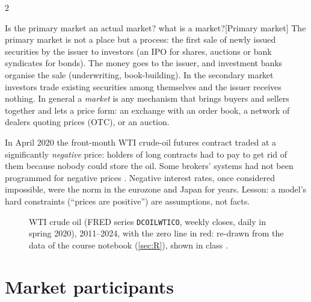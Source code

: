 \begin{paracol}{2}
\begin{answer}{Is the primary market an actual market? what is a market?}[Primary market]
The primary market is not a place but a process: the first sale of newly issued securities by
the issuer to investors (an IPO for shares, auctions or bank syndicates for bonds). The money goes to
the issuer, and investment banks organise the sale (underwriting, book-building). In the secondary
market investors trade existing securities among themselves and the issuer receives nothing.
In general a \emph{market} is any mechanism that brings buyers and sellers together and lets a price
form: an exchange with an order book, a network of dealers quoting prices (OTC), or an auction.
\end{answer}

\begin{finance}
In April 2020 the front-month WTI crude-oil futures contract traded at a significantly
\emph{negative} price: holders of long contracts had to pay to get rid of them because nobody
could store the oil. Some brokers' systems had not been programmed for negative prices
. Negative interest rates, once considered impossible, were the norm in the
eurozone and Japan for years. Lesson: a model's hard constraints (``prices are positive'') are
assumptions, not facts.
\end{finance}

\begin{figure}[ht]
\centering
{}
\caption{WTI crude oil (FRED series \texttt{DCOILWTICO}, weekly closes, daily in spring 2020),
2011--2024, with the zero line in red: re-drawn from the data of the course notebook
 (\cref{sec:R}), shown in class .}\label{fig:wti}
\end{figure}


\section{Market participants}\label{sec:participants}


\end{paracol}
